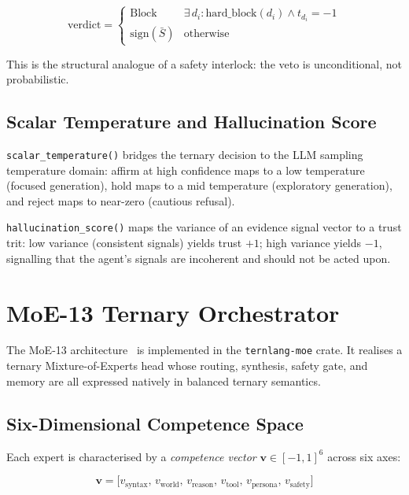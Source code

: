 \documentclass[11pt,a4paper]{article}
\begin{document}
\begin{equation}
  \text{verdict} = \begin{cases}
    \text{Block} & \exists\, d_i : \text{hard\_block}(d_i) \wedge t_{d_i} = -1 \\
    \text{sign}(\bar{S}) & \text{otherwise}
  \end{cases}
  \label{eq:gate}
\end{equation}

This is the structural analogue of a safety interlock: the veto is
unconditional, not probabilistic.

\subsection{Scalar Temperature and Hallucination Score}

\texttt{scalar\_temperature()} bridges the ternary decision to the LLM
sampling temperature domain: affirm at high confidence maps to a low
temperature (focused generation), hold maps to a mid temperature
(exploratory generation), and reject maps to near-zero (cautious refusal).

\texttt{hallucination\_score()} maps the variance of an evidence signal
vector to a trust trit: low variance (consistent signals) yields trust $+1$;
high variance yields $-1$, signalling that the agent's signals are
incoherent and should not be acted upon.

\section{MoE-13 Ternary Orchestrator}
\label{sec:moe}

The MoE-13 architecture~\cite{moe13_2026} is implemented in the
\texttt{ternlang-moe} crate. It realises a ternary Mixture-of-Experts head
whose routing, synthesis, safety gate, and memory are all expressed natively
in balanced ternary semantics.

\subsection{Six-Dimensional Competence Space}

Each expert is characterised by a \emph{competence vector}
$\mathbf{v} \in [-1,1]^6$ across six axes:

\begin{equation}
  \mathbf{v} = \bigl[
    v_\text{syntax},\,
    v_\text{world},\,
    v_\text{reason},\,
    v_\text{tool},\,
    v_\text{persona},\,
    v_\text{safety}
  \bigr]
  \label{eq:competence}
\end{equation}
\end{document}
